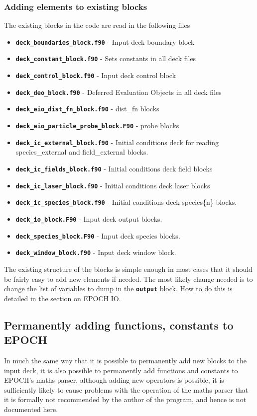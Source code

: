 \documentclass[12pt]{article}
\newcommand{\inlinecode}[1]{{\color{warwickred} \bf\texttt{#1}}}
\newcommand{\nEPOCH}{{\color{warwickdark}\fontfamily{phv}\selectfont EPOCH}}
\newcommand{\EPOCH}{{\nEPOCH} }
\begin{document}
\subsubsection{Adding elements to existing blocks}
The existing blocks in the code are read in the following files
\begin{itemize}
\item \inlinecode{deck\_boundaries\_block.f90} - Input deck boundary block
\item \inlinecode{deck\_constant\_block.f90} - Sets constants in all deck files
\item \inlinecode{deck\_control\_block.f90} - Input deck control block
\item \inlinecode{deck\_deo\_block.f90} - Deferred Evaluation Objects in all
  deck files
\item \inlinecode{deck\_eio\_dist\_fn\_block.f90} - dist\_fn blocks
\item \inlinecode{deck\_eio\_particle\_probe\_block.F90} - probe blocks
\item \inlinecode{deck\_ic\_external\_block.f90} - Initial conditions deck for
  reading species\_external and field\_external blocks.
\item \inlinecode{deck\_ic\_fields\_block.f90} - Initial conditions deck field
  blocks
\item \inlinecode{deck\_ic\_laser\_block.f90} - Initial conditions deck laser
  blocks
\item \inlinecode{deck\_ic\_species\_block.f90} - Initial conditions deck
  species\{n\} blocks.
\item \inlinecode{deck\_io\_block.F90} - Input deck output blocks.
\item \inlinecode{deck\_species\_block.F90} - Input deck species blocks.
\item \inlinecode{deck\_window\_block.f90} - Input deck window block.
\end{itemize}

The existing structure of the blocks is simple enough in most cases that it
should be fairly easy to add new elements if needed. The most likely change
needed is to change the list of variables to dump in the \inlinecode{output}
block. How to do this is detailed in the section on \EPOCH IO.

\subsection{Permanently adding functions, constants to \EPOCH}
In much the same way that it is possible to permanently add new blocks to the
input deck, it is also possible to permanently add functions and constants to
EPOCH's maths parser, although adding new operators is possible, it is
sufficiently likely to cause problems with the operation of the maths parser
that it is formally not recommended by the author of the program, and hence is
not documented here.
\end{document}
